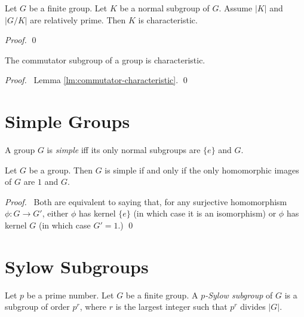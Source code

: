 \begin{prop}
\label{prop:K-GK-relatively-prime-K-characteristic}
Let $G$ be a finite group. Let $K$ be a normal subgroup of $G$. Assume $|K|$ and $|G/K|$ are relatively prime. Then $K$ is characteristic.
\end{prop}

\begin{proof}
\pf
{}
\qed
\end{proof}

\begin{prop}
The commutator subgroup of a group is characteristic.
\end{prop}

\begin{proof}
\pf\ Lemma \ref{lm:commutator-characteristic}. \qed
\end{proof}

\section{Simple Groups}

\begin{df}
A group $G$ is \emph{simple} iff its only normal subgroups are $\{e\}$ and $G$.
\end{df}

\begin{prop}
\label{prop:image_of_simple_group}
Let $G$ be a group. Then $G$ is simple if and only if the only homomorphic images of $G$ are $1$ and $G$.
\end{prop}

\begin{proof}
\pf\ Both are equivalent to saying that, for any surjective homomorphism $\phi : G \rightarrow G'$, either $\phi$ has kernel $\{e\}$ (in which case it is an isomorphism) or $\phi$ has kernel $G$ (in which case $G' = 1$.) \qed
\end{proof}

\section{Sylow Subgroups}

\begin{df}
Let $p$ be a prime number. Let $G$ be a finite group. A \emph{$p$-Sylow subgroup} of $G$ is a subgroup of order $p^r$, where $r$ is the largest integer such that $p^r$ divides $|G|$.
\end{df}

